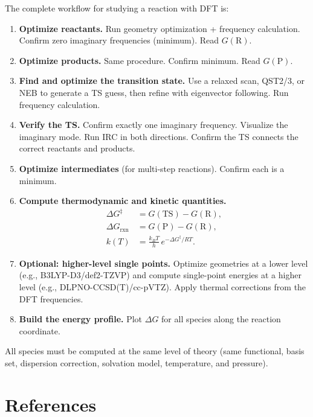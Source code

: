 \documentclass[11pt]{article}
\numberwithin{equation}{section}
\begin{document}
The complete workflow for studying a reaction with DFT is:

\begin{enumerate}
\item \textbf{Optimize reactants.} Run geometry optimization + frequency calculation. Confirm zero imaginary frequencies (minimum). Read $G(\text{R})$.

\item \textbf{Optimize products.} Same procedure. Confirm minimum. Read $G(\text{P})$.

\item \textbf{Find and optimize the transition state.} Use a relaxed scan, QST2/3, or NEB to generate a TS guess, then refine with eigenvector following. Run frequency calculation.

\item \textbf{Verify the TS.} Confirm exactly one imaginary frequency. Visualize the imaginary mode. Run IRC in both directions. Confirm the TS connects the correct reactants and products.

\item \textbf{Optimize intermediates} (for multi-step reactions). Confirm each is a minimum.

\item \textbf{Compute thermodynamic and kinetic quantities.}
\begin{align}
\Delta G^\ddagger &= G(\text{TS}) - G(\text{R}), \\
\Delta G_\text{rxn} &= G(\text{P}) - G(\text{R}), \\
k(T) &= \frac{k_BT}{h}\,e^{-\Delta G^\ddagger/RT}.
\end{align}

\item \textbf{Optional: higher-level single points.} Optimize geometries at a lower level (e.g., B3LYP-D3/def2-TZVP) and compute single-point energies at a higher level (e.g., DLPNO-CCSD(T)/cc-pVTZ). Apply thermal corrections from the DFT frequencies.

\item \textbf{Build the energy profile.} Plot $\Delta G$ for all species along the reaction coordinate.
\end{enumerate}

All species must be computed at the same level of theory (same functional, basis set, dispersion correction, solvation model, temperature, and pressure).


\section*{References}
\end{document}
